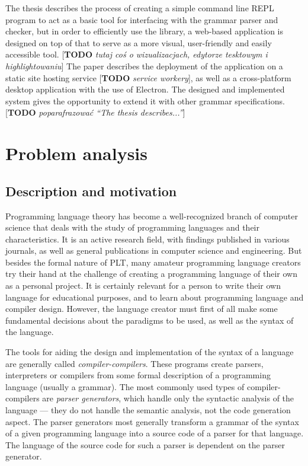 \documentclass[english,engineering]{wizthesis}
\newcommand{\todo}[1]{{\color{red}[\textbf{TODO} \textit{#1}]}}
\begin{document}
The thesis describes the process of creating a simple command line REPL program
to act as a basic tool for interfacing with the grammar parser and checker, but
in order to efficiently use the library, a web-based application is designed on
top of that to serve as a more visual, user-friendly and easily accessible tool.
\todo{tutaj coś o wizualizacjach, edytorze tesktowym i highlightowaniu} The
paper describes the deployment of the application on a static site hosting
service \todo{service workery}, as well as a cross-platform desktop application
with the use of Electron. The designed and implemented system gives the
opportunity to extend it with other grammar specifications.
\todo{poparafrazować ``The thesis describes...''}

\tableofcontents

\mainmatter %

\chapter{Problem analysis}

\section{Description and motivation} \label{sec:description-and-motivation}

Programming language theory has become a well-recognized branch of computer
science that deals with the study of programming languages and their
characteristics. It is an active research field, with findings published in
various journals, as well as general publications in computer science and
engineering. But besides the formal nature of PLT, many amateur programming
language creators try their hand at the challenge of creating a programming
language of their own as a personal project. It is certainly relevant for a
person to write their own language for educational purposes, and to learn about
programming language and compiler design. However, the language creator must
first of all make some fundamental decisions about the paradigms to be used, as
well as the syntax of the language.

The tools for aiding the design and implementation of the syntax of a language
are generally called \textit{compiler-compilers}. These programs create parsers,
interpreters or compilers from some formal description of a programming
language (usually a grammar). The most commonly used types of
compiler-compilers are \textit{parser generators}, which handle only the
syntactic analysis of the language --- they do not handle the semantic analysis,
not the code generation aspect. The parser generators most generally transform a
grammar of the syntax of a given programming language into a source code of a
parser for that language. The language of the source code for such a parser is
dependent on the parser generator.
\end{document}

